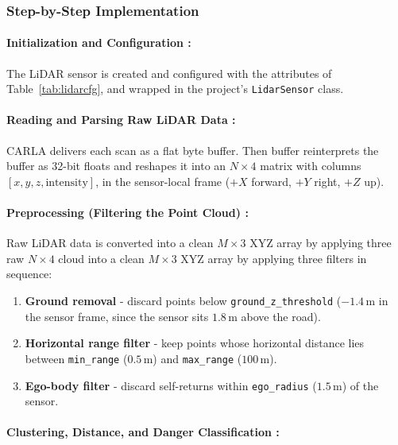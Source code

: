 \documentclass[12pt, a4paper]{report}
\begin{document}
\subsubsection{Step-by-Step Implementation}

\paragraph{Initialization and Configuration :}

The LiDAR sensor is created and configured with the attributes of Table~\ref{tab:lidarcfg}, and wrapped in the
project's \texttt{LidarSensor} class. 

\paragraph{Reading and Parsing Raw LiDAR Data :}

CARLA delivers each scan as a flat byte buffer. Then buffer reinterprets the 
buffer as 32-bit floats and reshapes it into an $N \times 4$
matrix with columns $[x, y, z, \text{intensity}]$, in the sensor-local frame
($+X$ forward, $+Y$ right, $+Z$ up).

\paragraph{Preprocessing (Filtering the Point Cloud) :}

Raw LiDAR data is converted into a clean $M \times 3$ XYZ array by applying three
raw $N \times 4$ cloud into a clean $M \times 3$ XYZ array by applying three
filters in sequence:

\begin{enumerate}
    \item \textbf{Ground removal} - discard points below
    \texttt{ground\_z\_threshold} ($-1.4$\,m in the sensor frame, since the
    sensor sits $1.8$\,m above the road).
    \item \textbf{Horizontal range filter} - keep points whose horizontal
    distance lies between \texttt{min\_range} ($0.5$\,m) and \texttt{max\_range}
    ($100$\,m).
    \item \textbf{Ego-body filter} - discard self-returns within
    \texttt{ego\_radius} ($1.5$\,m) of the sensor.
\end{enumerate}

\paragraph{Clustering, Distance, and Danger Classification :}
\end{document}
